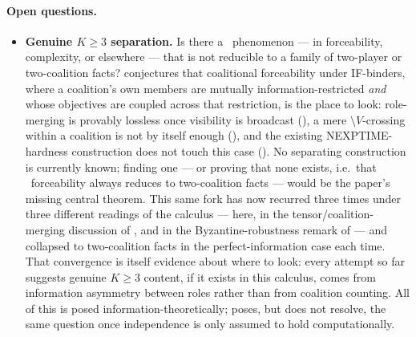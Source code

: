 \paragraph{Open questions.}
\begin{itemize}
  \item \textbf{Genuine $K\ge 3$ separation.} Is there a \KFOL\ phenomenon ---
  in forceability, complexity, or elsewhere --- that is not reducible to a
  family of two-player or two-coalition facts? 
  conjectures that coalitional forceability under IF-binders, where a
  coalition's own members are mutually information-restricted \emph{and}
  whose objectives are coupled across that restriction, is the place to look:
  role-merging is provably lossless once visibility is broadcast
  (), a mere $\setminus V$-crossing within
  a coalition is not by itself enough
  (), and the existing NEXPTIME-hardness
  construction does not touch this case (). No
  separating construction is currently known; finding one --- or proving that
  none exists, i.e.\ that \KFOL\ forceability always reduces to two-coalition
  facts --- would be the paper's missing central theorem. This same fork has
  now recurred three times under three different readings of the calculus ---
  here, in the tensor/coalition-merging discussion of
  , and in the Byzantine-robustness remark of
   --- and collapsed to two-coalition facts in the
  perfect-information case each time. That convergence is itself evidence
  about where to look: every attempt so far suggests genuine $K\ge 3$ content,
  if it exists in this calculus, comes from information asymmetry between
  roles rather than from coalition counting. All of this is posed
  information-theoretically; 
  poses, but does not resolve, the same question once independence is only
  assumed to hold computationally.


\end{itemize}
